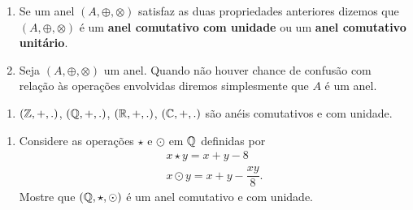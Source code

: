 \documentclass{beamer}
\begin{document}
    \begin{frame}
        \begin{observacoes}
            \begin{enumerate}[label={\arabic*})]
                \conti

                \item Se um anel $(A, \oplus, \otimes)$ \pause satisfaz as duas propriedades anteriores \pause dizemos que $(A, \oplus, \otimes)$ \'e um \textbf{anel comutativo com unidade} \pause ou um \textbf{anel comutativo unit\'ario}.\pause

                \vspace{.5cm}

                \item Seja $(A, \oplus, \otimes)$ um anel. \pause Quando n\~ao houver chance de confus\~ao com rela\c{c}\~ao \`as opera\c{c}\~oes envolvidas diremos simplesmente que \pause $A$ \'e um anel.\pause
            \end{enumerate}
        \end{observacoes}
    \end{frame}

    \begin{frame}
        \begin{exemplos}
            \begin{enumerate}[label={\arabic*})]
                \item $(\mathbb{Z},+,.)$, \pause $(\mathbb{Q},+,.)$, \pause $(\mathbb{R},+,.)$, \pause $(\mathbb{C},+,.)$ s{\~a}o an{\'e}is comutativos \pause e com unidade.\pause

                \seti
            \end{enumerate}
        \end{exemplos}
    \end{frame}

    \begin{frame}
        \begin{exemplos}
            \begin{enumerate}[label={\arabic*})]
                \conti

                \item Considere as opera\c{c}\~oes $\star$ e $\odot$ em $\mathbb{Q}$ definidas por
                    \begin{align*}
                        x \star y = x + y - 8\\
                        x \odot y = x + y - \dfrac{xy}{8}.
                    \end{align*}
                    Mostre que $(\mathbb{Q}, \star, \odot)$ \'e um anel comutativo e com unidade.
            \end{enumerate}
        \end{exemplos}
    \end{frame}
\end{document}
